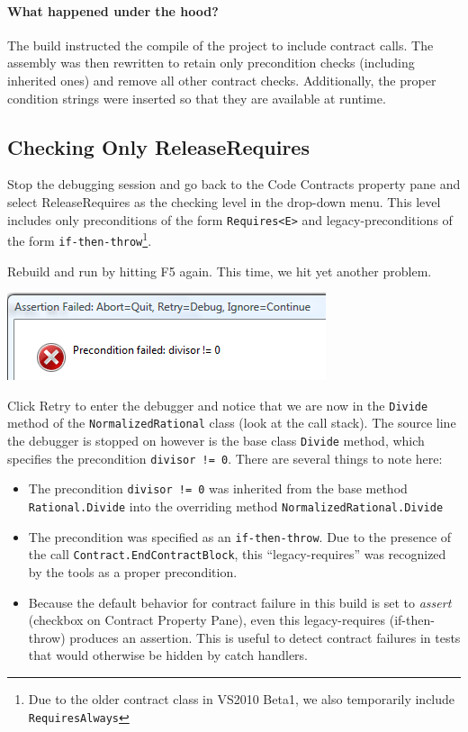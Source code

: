 \documentclass{article}
\newcommand{\code}[1]{\lstinline{#1}}
\begin{document}
\paragraph{What happened under the hood?} The build instructed the compile
of the project to include contract calls. The assembly was
then rewritten to retain only precondition checks (including inherited
ones) and remove all other
contract checks. Additionally, the proper condition strings were inserted so that they are available
at runtime.

\pagebreak[1]
\subsection{Checking Only ReleaseRequires}
Stop the debugging session and go back to the \textsf{Code Contracts}
property pane and select \textsf{ReleaseRequires} as the checking level
in the drop-down menu. This level includes only preconditions of the
form \code{Requires<E>} and legacy-preconditions of the form
\code{if-then-throw}\footnote{Due to the older contract class in
  VS2010 Beta1, we also temporarily include \code{RequiresAlways}}.

Rebuild and run by hitting F5 again. This time, we hit yet another
problem.
\begin{center}
  \includegraphics[width=.7\columnwidth]{ex5.png}
\end{center}
Click \textsf{Retry} to enter the debugger and notice that we are now
in the \code{Divide} method of the \code{NormalizedRational}
class (look at the call stack). The source line the debugger is
stopped on however is the base class \code{Divide} method, which specifies
the precondition \code{divisor != 0}. There are several things to note
here:
\begin{itemize}
\item The precondition \code{divisor != 0} was inherited from the base
  method \code{Rational.Divide} into the overriding method
  \code{NormalizedRational.Divide}

\item The precondition was specified as an \code{if-then-throw}. Due
  to the presence of the call \code{Contract.EndContractBlock}, this
  ``legacy-requires'' was recognized by the tools as a proper
  precondition.

\item Because the default behavior for contract failure in this build
  is set to \emph{assert} (checkbox on Contract Property Pane), even
  this legacy-requires (if-then-throw) produces an assertion. This is
  useful to detect contract failures in tests that would otherwise be
  hidden by catch handlers.

\end{itemize}
\end{document}
